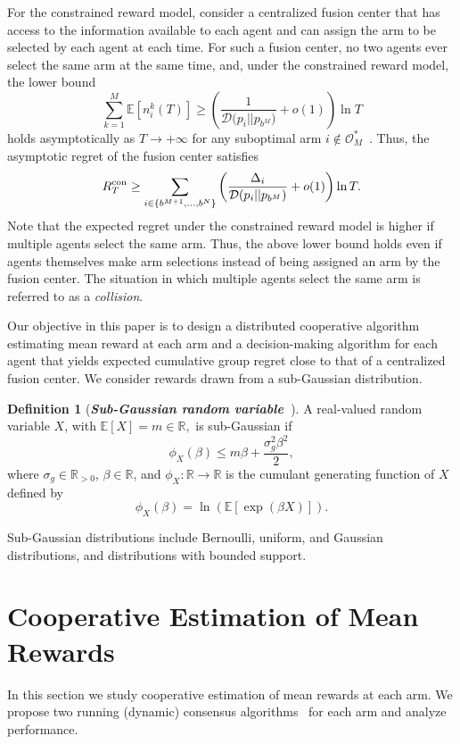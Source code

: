 \documentclass[final,5p,times,twocolumn]{elsarticle}
\theoremstyle{definition}
\newtheorem{definition}{Definition}
\def \mc {\mathcal}
\def\expt{\mathbb{E}}
\def\real{\mathbb{R}}
\newcommand{\supscr}[2]{#1^{\textup{#2}}}
\newcommand{\map}[3]{#1: #2 \rightarrow #3}
\newcommand{\lnn}[1]{%
	\ln  \left(#1\right)%
}
\newcommand{\expp}[1]{%
	\exp \! \left(#1\right)%
}
\newcommand\bit[1]{\textit{\textbf{#1}}}
\begin{document}
For the constrained reward model, consider a centralized fusion center that has access to the information available to each agent and can assign the arm to be selected by each agent at each time. For such a fusion center, no two agents ever select the same arm at the same time, and, under the constrained reward model, the lower bound
\begin{equation}
\sum_{k=1}^M	 \expt[n_i^k(T)] \ge \left(\frac{1}{ \mathcal{D} (p_i || {p_{b^M})}}  +o(1) \right) \ln T \label{eqn:fusioncenterregret-cons}
\end{equation}
holds asymptotically as $T \to +\infty$ for any suboptimal arm {$i \notin \mc O_M^*$}~\cite{VA-PV-JW:87}. Thus, the asymptotic regret of the fusion center satisfies
\begin{equation}\label{eqn:regret-cons-lower}
\supscr{R}{con}_T \ge {\sum_{i\in \{b^{M+1}, \ldots, b^N\}}} \left(\frac{\Delta_i}{ \mathcal{D} (p_i || {p_{b^M})}}  +o(1) \right) \ln T.
\end{equation}
Note that the expected regret under the constrained reward model is higher if multiple agents select the same arm. Thus, the above lower bound holds even if agents themselves make arm selections instead of being assigned an arm by the fusion center. The situation in which multiple agents select the same arm is referred to as a \emph{collision}.

Our objective in this paper is to design a distributed cooperative algorithm estimating mean reward at each arm  and  a decision-making algorithm for each agent that yields expected cumulative group regret close to that of a {centralized fusion center}. 
We consider rewards drawn from a sub-Gaussian distribution. 

\begin{definition}[\bit{Sub-Gaussian random variable~\cite{boucheron_2016}}]\label{defn:sub-gaussian}
A real-valued random variable $X$, with $\expt[X] =m \in \real,$ is sub-Gaussian if 	
\begin{equation*}
	\phi_X (\beta) \leq m \beta +\frac{\sigma_g^2 \beta^2}{2},
\end{equation*}
%
where $\sigma_g \in \real_{>0}$, $\beta \in \real$, and $\map{\phi_X}{\real}{\real}$ is  the cumulant generating function of $X$ defined by
\[
\phi_X(\beta) = \lnn{\mathbb{E}[\expp{\beta X}]}.
\]
\end{definition}
Sub-Gaussian distributions include Bernoulli, uniform, and Gaussian distributions, and distributions with bounded support. 


\section{Cooperative Estimation of Mean Rewards} \label{sec:coop-est}
In this section we study  cooperative estimation of mean rewards at each 
arm. We propose two running (dynamic) consensus algorithms~\cite{braca2008enforcing,olfati2004consensus} for each arm and analyze performance.
\end{document}
